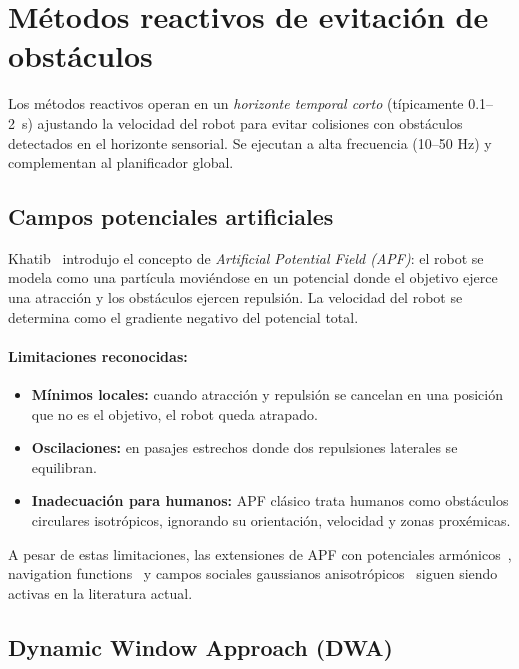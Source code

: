 \documentclass[12pt,a4paper,oneside]{book}
\begin{document}
\section{Métodos reactivos de evitación de obstáculos}
\label{doc7:sec:reactive}

Los métodos reactivos operan en un \emph{horizonte temporal corto} (típicamente 0.1--2~s) ajustando la velocidad del robot para evitar colisiones con obstáculos detectados en el horizonte sensorial. Se ejecutan a alta frecuencia (10--50 Hz) y complementan al planificador global.

\subsection{Campos potenciales artificiales}

Khatib~\cite{Khatib1986} introdujo el concepto de \emph{Artificial Potential Field (APF)}: el robot se modela como una partícula moviéndose en un potencial donde el objetivo ejerce una atracción y los obstáculos ejercen repulsión. La velocidad del robot se determina como el gradiente negativo del potencial total.

\paragraph{Limitaciones reconocidas:}
\begin{itemize}
    \item \textbf{Mínimos locales:} cuando atracción y repulsión se cancelan en una posición que no es el objetivo, el robot queda atrapado.
    \item \textbf{Oscilaciones:} en pasajes estrechos donde dos repulsiones laterales se equilibran.
    \item \textbf{Inadecuación para humanos:} APF clásico trata humanos como obstáculos circulares isotrópicos, ignorando su orientación, velocidad y zonas proxémicas.
\end{itemize}

A pesar de estas limitaciones, las extensiones de APF con potenciales armónicos~\cite{Connolly1990}, navigation functions~\cite{Rimon1992} y campos sociales gaussianos anisotrópicos~\cite{Kirby2009,Pradalier2003} siguen siendo activas en la literatura actual.

\subsection{Dynamic Window Approach (DWA)}
\end{document}
